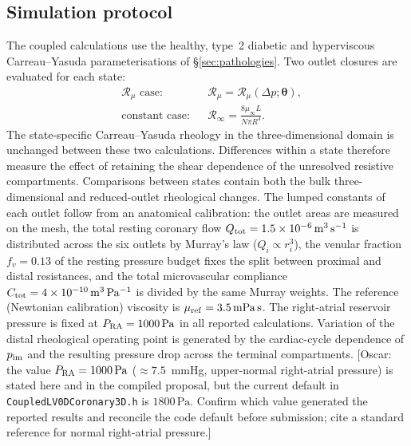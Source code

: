 \documentclass[lineno]{jfm}
\begin{document}
\subsection{Simulation protocol}
\label{sec:simulation-protocol}
The coupled calculations use the healthy, type~2 diabetic and hyperviscous
Carreau--Yasuda parameterisations of \S\ref{sec:pathologies}. Two outlet
closures are evaluated for each state:
\begin{equation}
\begin{aligned}
&\text{$\mathcal{R}_{\mu}$ case:}
&&
\mathcal{R}_{\mu}
=
\mathcal{R}_{\mu}(\Delta p;\boldsymbol\theta),
\\
&\text{constant case:}
&&
\mathcal{R}_{\infty}
=
\frac{8\mu_\infty L}{N\pi R^4}.
\end{aligned}
\label{eq:simulation-cases}
\end{equation}
The state-specific Carreau--Yasuda rheology in the three-dimensional domain is
unchanged between these two calculations. Differences within a state therefore
measure the effect of retaining the shear dependence of the unresolved
resistive compartments. Comparisons between states contain both the bulk
three-dimensional and reduced-outlet rheological changes.
The lumped constants of each outlet follow from an anatomical calibration:
the outlet areas are measured on the mesh, the total resting coronary flow
$Q_{\rm tot}=1.5\times10^{-6}\,\mathrm{m^{3}\,s^{-1}}$ is distributed across
the six outlets by Murray's law
($Q_i\propto r_i^{3}$), the venular fraction $f_v=0.13$ of the resting
pressure budget fixes the split between proximal and distal resistances, and
the total microvascular compliance
$C_{\rm tot}=4\times10^{-10}\,\mathrm{m^{3}\,Pa^{-1}}$ is divided by the
same Murray weights. The reference (Newtonian calibration) viscosity is
$\mu_{\rm ref}=3.5\,\mathrm{mPa\,s}$.
The right-atrial reservoir pressure is fixed at
$P_{\rm RA}=1000\,\mathrm{Pa}$ in all reported calculations. Variation of the
distal rheological operating point is generated by the cardiac-cycle dependence
of $p_{\rm im}$ and the resulting pressure drop across the terminal
compartments.
{\color{red}[Oscar: the value $P_{\rm RA}=1000\,\mathrm{Pa}$
($\approx7.5$~mmHg, upper-normal right-atrial pressure) is stated here and
in the compiled proposal, but the current default in
\texttt{CoupledLV0DCoronary3D.h} is $1800\,\mathrm{Pa}$. Confirm which value
generated the reported results and reconcile the code default before
submission; cite a standard reference for normal right-atrial pressure.]}
\end{document}
